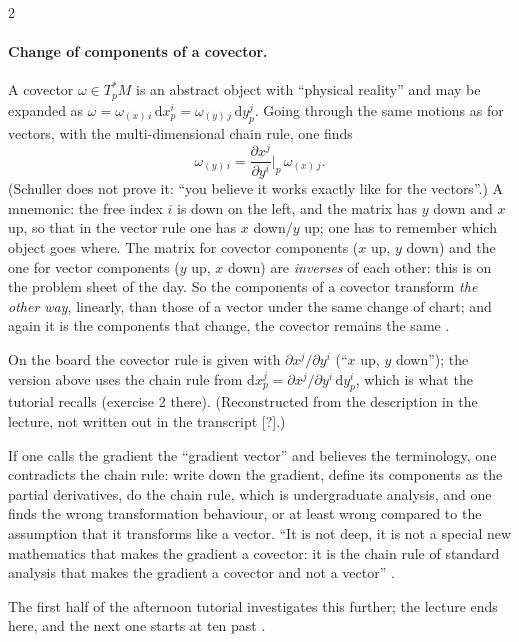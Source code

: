 \begin{paracol}{2}
\paragraph{Change of components of a covector.} A covector $\omega\in T^*_pM$ is an abstract object with ``physical reality'' and may be expanded as $\omega=\omega_{(x)\,i}\,\mathrm dx^i_p=\omega_{(y)\,j}\,\mathrm dy^j_p$. Going through the same motions as for vectors, with the multi-dimensional chain rule, one finds
\[
  \omega_{(y)\,i}=\frac{\partial x^j}{\partial y^i}\Big|_p\,\omega_{(x)\,j}.
\]
(Schuller does not prove it: ``you believe it works exactly like for the vectors''.) A mnemonic: the free index $i$ is down on the left, and the matrix has $y$ down and $x$ up, so that in the vector rule one has $x$ down/$y$ up; one has to remember which object goes where. The matrix for covector components ($x$ up, $y$ down) and the one for vector components ($y$ up, $x$ down) are \emph{inverses} of each other: this is on the problem sheet of the day. So the components of a covector transform \emph{the other way}, linearly, than those of a vector under the same change of chart; and again it is the components that change, the covector remains the same
.
\begin{coursenote}
On the board the covector rule is given with $\partial x^j/\partial y^i$ (``$x$ up, $y$ down''); the version above uses the chain rule from $\mathrm dx^j_p=\partial x^j/\partial y^i\,\mathrm dy^i_p$, which is what the tutorial recalls (exercise 2 there). (Reconstructed from the description in the lecture, not written out in the transcript [?].)
\end{coursenote}

\begin{remark}\label{rem:c05-gradient}
If one calls the gradient the ``gradient vector'' and believes the terminology, one contradicts the chain rule: write down the gradient, define its components as the partial derivatives, do the chain rule, which is undergraduate analysis, and one finds the wrong transformation behaviour, or at least wrong compared to the assumption that it transforms like a vector. ``It is not deep, it is not a special new mathematics that makes the gradient a covector: it is the chain rule of standard analysis that makes the gradient a covector and not a vector''
.
\end{remark}
The first half of the afternoon tutorial investigates this further; the lecture ends here, and the next one starts at ten past .


\end{paracol}
